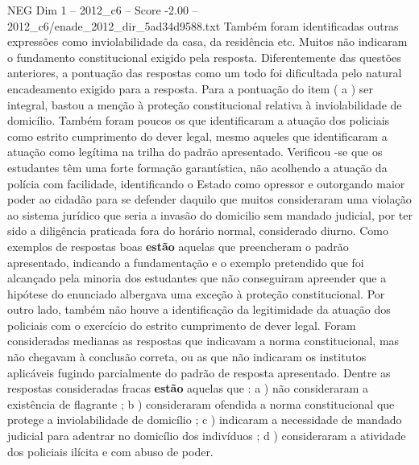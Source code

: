\begin{textsample}{NEG Dim 1 – 2012\_c6 – Score -2.00 – 2012\_c6/enade\_2012\_dir\_5ad34d9588.txt}
Também foram identificadas outras expressões como inviolabilidade da casa, da residência etc.
Muitos não indicaram o fundamento constitucional exigido pela resposta.
Diferentemente das questões anteriores, a pontuação das respostas como um todo foi dificultada pelo natural encadeamento exigido para a resposta.
Para a pontuação do item ( a ) ser integral, bastou a menção à proteção constitucional relativa à inviolabilidade de domicílio.
Também foram poucos os que identificaram a atuação dos policiais como estrito cumprimento do dever legal, mesmo aqueles que identificaram a atuação como legítima na trilha do padrão apresentado.
Verificou -se que os estudantes têm uma forte formação garantística, não acolhendo a atuação da polícia com facilidade, identificando o Estado como opressor e outorgando maior poder ao cidadão para se defender daquilo que muitos consideraram uma violação ao sistema jurídico que seria a invasão do domicilio sem mandado judicial, por ter sido a diligência praticada fora do horário normal, considerado diurno.
Como exemplos de respostas boas \textbf{estão} aquelas que preencheram o padrão apresentado, indicando a fundamentação e o exemplo pretendido que foi alcançado pela minoria dos estudantes que não conseguiram apreender que a hipótese do enunciado albergava uma exceção à proteção constitucional.
Por outro lado, também não houve a identificação da legitimidade da atuação dos policiais com o exercício do estrito cumprimento de dever legal.
Foram consideradas medianas as respostas que indicavam a norma constitucional, mas não chegavam à conclusão correta, ou as que não indicaram os institutos aplicáveis fugindo parcialmente do padrão de resposta apresentado.
Dentre as respostas consideradas fracas \textbf{estão} aquelas que : a ) não consideraram a existência de flagrante ; b ) consideraram ofendida a norma constitucional que protege a inviolabilidade de domicílio ; c ) indicaram a necessidade de mandado judicial para adentrar no domicílio dos indivíduos ; d ) consideraram a atividade dos policiais ilícita e com abuso de poder.

\end{textsample}
